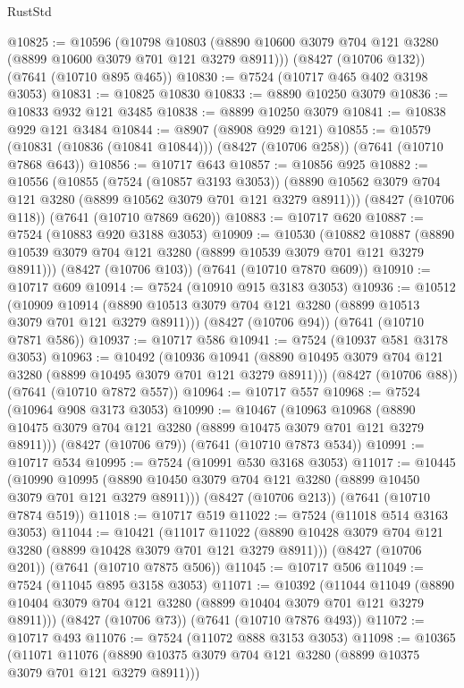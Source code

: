 \begin{lexlean}{RustStd}
\begin{coremodule}
@10825 := @10596
    (@10798 @10803 (@8890 @10600 @3079 @704 @121 @3280 (@8899 @10600 @3079 @701 @121 @3279 @8911)))
    (@8427 (@10706 @132))
    (@7641 (@10710 @895 @465))
@10830 := @7524 (@10717 @465 @402 @3198 @3053)
@10831 := @10825 @10830
@10833 := @8890 @10250 @3079
@10836 := @10833 @932 @121 @3485
@10838 := @8899 @10250 @3079
@10841 := @10838 @929 @121 @3484
@10844 := @8907 (@8908 @929 @121)
@10855 := @10579 (@10831 (@10836 (@10841 @10844))) (@8427 (@10706 @258)) (@7641 (@10710 @7868 @643))
@10856 := @10717 @643
@10857 := @10856 @925
@10882 := @10556
    (@10855
      (@7524 (@10857 @3193 @3053))
      (@8890 @10562 @3079 @704 @121 @3280 (@8899 @10562 @3079 @701 @121 @3279 @8911)))
    (@8427 (@10706 @118))
    (@7641 (@10710 @7869 @620))
@10883 := @10717 @620
@10887 := @7524 (@10883 @920 @3188 @3053)
@10909 := @10530
    (@10882 @10887 (@8890 @10539 @3079 @704 @121 @3280 (@8899 @10539 @3079 @701 @121 @3279 @8911)))
    (@8427 (@10706 @103))
    (@7641 (@10710 @7870 @609))
@10910 := @10717 @609
@10914 := @7524 (@10910 @915 @3183 @3053)
@10936 := @10512
    (@10909 @10914 (@8890 @10513 @3079 @704 @121 @3280 (@8899 @10513 @3079 @701 @121 @3279 @8911)))
    (@8427 (@10706 @94))
    (@7641 (@10710 @7871 @586))
@10937 := @10717 @586
@10941 := @7524 (@10937 @581 @3178 @3053)
@10963 := @10492
    (@10936 @10941 (@8890 @10495 @3079 @704 @121 @3280 (@8899 @10495 @3079 @701 @121 @3279 @8911)))
    (@8427 (@10706 @88))
    (@7641 (@10710 @7872 @557))
@10964 := @10717 @557
@10968 := @7524 (@10964 @908 @3173 @3053)
@10990 := @10467
    (@10963 @10968 (@8890 @10475 @3079 @704 @121 @3280 (@8899 @10475 @3079 @701 @121 @3279 @8911)))
    (@8427 (@10706 @79))
    (@7641 (@10710 @7873 @534))
@10991 := @10717 @534
@10995 := @7524 (@10991 @530 @3168 @3053)
@11017 := @10445
    (@10990 @10995 (@8890 @10450 @3079 @704 @121 @3280 (@8899 @10450 @3079 @701 @121 @3279 @8911)))
    (@8427 (@10706 @213))
    (@7641 (@10710 @7874 @519))
@11018 := @10717 @519
@11022 := @7524 (@11018 @514 @3163 @3053)
@11044 := @10421
    (@11017 @11022 (@8890 @10428 @3079 @704 @121 @3280 (@8899 @10428 @3079 @701 @121 @3279 @8911)))
    (@8427 (@10706 @201))
    (@7641 (@10710 @7875 @506))
@11045 := @10717 @506
@11049 := @7524 (@11045 @895 @3158 @3053)
@11071 := @10392
    (@11044 @11049 (@8890 @10404 @3079 @704 @121 @3280 (@8899 @10404 @3079 @701 @121 @3279 @8911)))
    (@8427 (@10706 @73))
    (@7641 (@10710 @7876 @493))
@11072 := @10717 @493
@11076 := @7524 (@11072 @888 @3153 @3053)
@11098 := @10365
    (@11071 @11076 (@8890 @10375 @3079 @704 @121 @3280 (@8899 @10375 @3079 @701 @121 @3279 @8911)))

\end{coremodule}
\end{lexlean}
